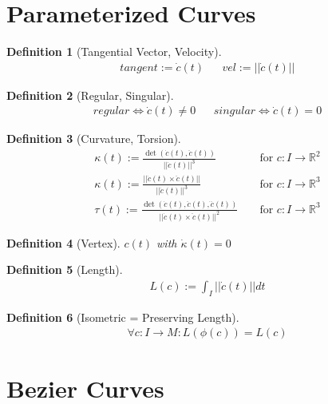 \documentclass[conference]{IEEEtran}
\newtheorem{definition}{Definition}
\begin{document}
\section{Parameterized Curves}

\begin{definition}[Tangential Vector, Velocity]
	\begin{align*}
		tangent := \dot{c}(t) && vel := ||\dot{c}(t)||
	\end{align*}
\end{definition}

\begin{definition}[Regular, Singular]
	\begin{align*}
		regular \iff \dot{c}(t) \neq 0 && singular \iff \dot{c}(t) = 0
	\end{align*}
\end{definition}

\begin{definition}[Curvature, Torsion]
	\begin{align*}
		\kappa(t) := \frac{\det(\dot{c}(t), \ddot{c}(t))}{||\dot{c}(t)||^3} && \text{ for } c:I \rightarrow \mathbb{R}^2\\
		\kappa(t) := \frac{||\dot{c}(t) \times \ddot{c}(t)||}{||\dot{c}(t)||^3} && \text{ for } c:I \rightarrow \mathbb{R}^3\\
		\tau(t) := \frac{\det(\dot{c}(t), \ddot{c}(t), \dddot{c}(t))}{||\dot{c}(t) \times \ddot{c}(t)||^2} && \text{ for } c:I \rightarrow \mathbb{R}^3
	\end{align*}
\end{definition}

\begin{definition}[Vertex]
	$c(t)$ with $\dot{\kappa}(t) = 0$
\end{definition}
	
\begin{definition}[Length]
	\begin{align*}
		L(c) := \int_I ||\dot{c}(t)|| dt
	\end{align*}
\end{definition}

\begin{definition}[Isometric = Preserving Length]
	\begin{align*}
		\forall c:I\rightarrow M: L(\phi(c)) = L(c)
	\end{align*}
\end{definition}

\section{Bezier Curves}
\end{document}

